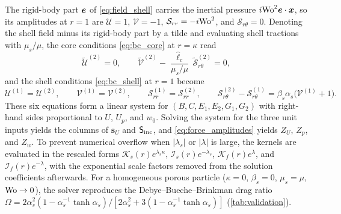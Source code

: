 The rigid-body part $\bm{e}$ of \cref{eq:field_shell} carries the inertial pressure $i\mathrm{Wo}^2\bm{e}\cdot\bm{x}$, so its amplitudes
at $r=1$ are $\mathcal U=1$, $\mathcal V=-1$, $\mathcal S_{rr}=-i\mathrm{Wo}^2$, and $\mathcal S_{r\theta}=0$. Denoting the shell
field minus its rigid-body part by a tilde and evaluating shell tractions with $\mu_s/\mu$, the core conditions
\cref{eq:bc_core} at $r=\kappa$ read
\begin{equation*}
  \tilde{\mathcal U}^{(2)}=0,\qquad \tilde{\mathcal V}^{(2)}-\frac{\hat\ell_c}{\mu_s/\mu}\,\tilde{\mathcal S}^{(2)}_{r\theta}=0,
\end{equation*}
and the shell conditions \cref{eq:bc_shell} at $r=1$ become
\begin{equation*}
  \mathcal U^{(1)}=\mathcal U^{(2)},\qquad \mathcal V^{(1)}=\mathcal V^{(2)},\qquad
  \mathcal S^{(1)}_{rr}=\mathcal S^{(2)}_{rr},\qquad
  \mathcal S^{(2)}_{r\theta}-\mathcal S^{(1)}_{r\theta}=\beta_s\alpha_s\bigl(\mathcal V^{(1)}+1\bigr).
\end{equation*}
These six equations form a linear system for $(B,C,E_1,E_2,G_1,G_2)$ with right-hand sides proportional to $U$, $U_p$,
and $w_0$. Solving the system for the three unit inputs yields the columns of $\bm s_U$ and $\mathsf S_{\rm inc}$, and
\cref{eq:force_amplitudes} yields $Z_U$, $Z_p$, and $Z_w$. To prevent numerical overflow when $|\lambda_s|$ or $|\lambda|$
is large, the kernels are evaluated in the rescaled forms $\mathcal K_s(r)e^{\lambda_s\kappa}$, $\mathcal I_s(r)e^{-\lambda_s}$,
$\mathcal K_f(r)e^{\lambda}$, and $\mathcal I_f(r)e^{-\lambda}$, with the exponential scale factors removed from the
solution coefficients afterwards. For a homogeneous porous particle ($\kappa=0$, $\beta_s=0$, $\mu_s=\mu$, $\mathrm{Wo}\to0$), the
solver reproduces the Debye--Bueche--Brinkman drag ratio
$\Omega=2\alpha_s^2(1-\alpha_s^{-1}\tanh\alpha_s)/[2\alpha_s^2+3(1-\alpha_s^{-1}\tanh\alpha_s)]$ (\cref{tab:validation}).

